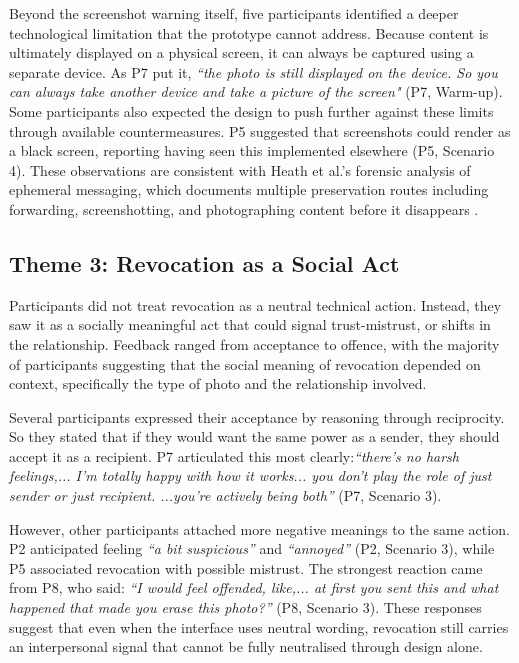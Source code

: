 Beyond the screenshot warning itself, five participants identified a deeper technological limitation that the prototype cannot address. Because content is ultimately displayed on a physical screen, it can always be captured using a separate device. As P7 put it, \textit{``the photo is still displayed on the device. So you can always take another device and take a picture of the screen"} (P7, Warm-up). Some participants also expected the design to push further against these limits through available countermeasures. P5 suggested that screenshots could render as a black screen, reporting having seen this implemented elsewhere (P5, Scenario 4). These observations are consistent with Heath et al.'s forensic analysis of ephemeral messaging, which documents multiple preservation routes including forwarding, screenshotting, and photographing content before it disappears \cite{heath_2023}.


\subsection{Theme 3: Revocation as a Social Act}
Participants did not treat revocation as a neutral technical action. Instead, they saw it as a socially meaningful act that could signal trust-mistrust, or shifts in the relationship. Feedback ranged from acceptance to offence, with the majority of participants suggesting that the social meaning of revocation depended on context, specifically the type of photo and the relationship involved.

Several participants expressed their acceptance by reasoning through reciprocity. So they stated that if they would want the same power as a sender, they should accept it as a recipient. P7 articulated this most clearly:\textit{``there's no harsh feelings,... I'm totally happy with how it works... you don't play the role of just sender or just recipient. ...you're actively being both''} (P7, Scenario 3). 

However, other participants attached more negative meanings to the same action. P2 anticipated feeling \textit{``a bit suspicious''} and \textit{``annoyed''} (P2, Scenario 3), while P5 associated revocation with possible mistrust. The strongest reaction came from P8, who said: \textit{``I would feel offended, like,... at first you sent this and what happened that made you erase this photo?''} (P8, Scenario 3). These responses suggest that even when the interface uses neutral wording, revocation still carries an interpersonal signal that cannot be fully neutralised through design alone.

